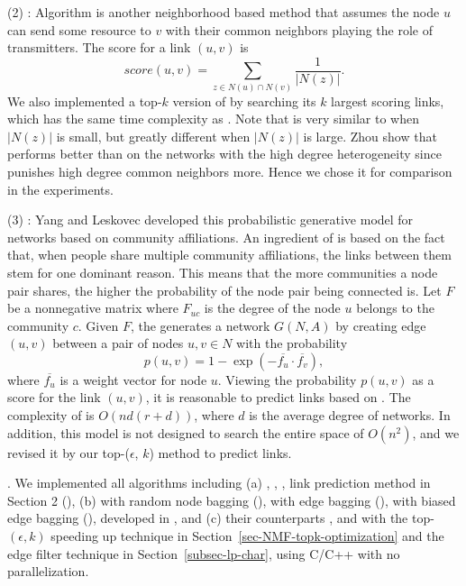 \sstab  (2) \Resource \cite{zhou2009}: Algorithm \RA is another
neighborhood based method that assumes the node $u$ can send some resource
to $v$ with their common neighbors playing the role of transmitters. The
\RA score for a link $(u, v)$ is
 \[ score(u, v) = \sum_{z \in N(u)\cap N(v)}\frac{1}{|N(z)|}.\]
We also implemented a top-$k$ version of \RA by searching its $k$ largest scoring links, which has the same time complexity as \Aa.
Note that \RA is very similar to \Aa when $|N(z)|$ is small, but
 greatly different when $|N(z)|$ is large. Zhou \etal \cite{zhou2009} show that
 \RA performs better than \Aa on the networks with the high degree heterogeneity since
 \RA punishes high degree common neighbors more.  Hence
 we chose it for comparison in the experiments.

\sstab  (3) \CAMBN \cite{yang-wsdm2013}:
  Yang and Leskovec developed this probabilistic generative model for networks
  based on community affiliations. An ingredient of \BIGCLAM is based on the fact that,
  when people share multiple community affiliations, the links between them stem for
  one dominant reason. This means that the more communities a node pair shares,
  the higher the probability of the  node pair being connected is.
  Let $F$ be a nonnegative matrix where $F_{uc}$ is the degree of the node $u$ belongs to
  the community $c$. Given $F$, the \BIGCLAM generates a network $G(N, A)$ by creating edge
  $(u, v)$ between a pair of nodes $u, v \in N$ with the probability
   \[ p(u, v) = 1 - \exp(-\overline{f_u}\cdot \overline{f_v}), \]
where $\overline{f_u}$ is a weight vector for node $u$. Viewing the probability $p(u, v)$ as
  a score for the link $(u, v)$, it is reasonable to predict links based on \BIGCLAM.
The complexity of  \BIGCLAM is $O(nd(r + d) )$, where $d$ is the average degree of networks.
  In addition, this model is not designed to search the entire space of $O( n^2 )$,
  and we revised it by our top-($\epsilon$, $k$) method to predict links.


.
We implemented all algorithms including (a) \Aa, \RA, \BIGCLAM,
link prediction method in Section 2 (\NMF),
(b) \NMF with random node bagging (\Node), \NMF with  edge bagging (\Edge),
\NMF with biased edge bagging (\Biased), developed in \cite{liang2016}, and (c) their counterparts \Nodep, \Edgep and \Biasedp with the top-$(\epsilon, k)$ speeding up technique in Section~\ref{sec-NMF-topk-optimization} and the edge filter technique in Section~\ref{subsec-lp-char}, using C/C++ with no parallelization.

